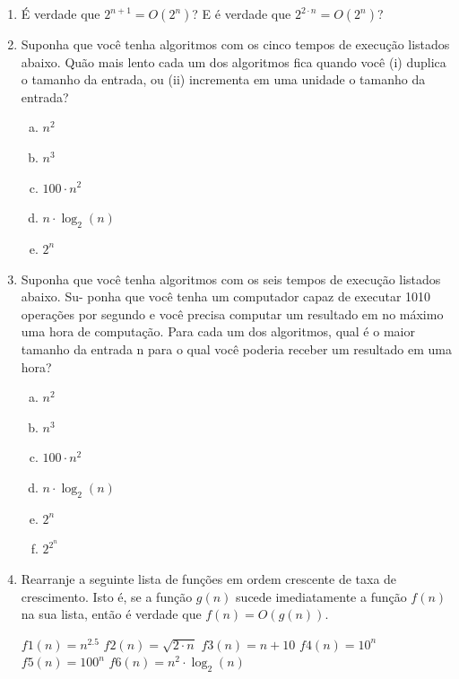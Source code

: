 \documentclass[a4paper,10pt]{article}
\begin{document}
\begin{enumerate}
 
 
\item É verdade que $2^{n+1} = O(2^n)$? E é verdade que $2^{2 \cdot n} = O(2^n)$?

\item Suponha que você tenha algoritmos com os cinco tempos de execução listados abaixo.
Quão mais lento cada um dos algoritmos fica quando você (i) duplica o tamanho da
entrada, ou (ii) incrementa em uma unidade o tamanho da entrada?

  \begin{enumerate}[(a)]
\item $n^2$
\item $n^3$
\item $100 \cdot n^2$
\item $n \cdot \log_2(n)$
\item $2^n$
  \end{enumerate}

\item Suponha que você tenha algoritmos com os seis tempos de execução listados abaixo. Su-
ponha que você tenha um computador capaz de executar 1010 operações por segundo
e você precisa computar um resultado em no máximo uma hora de computação. Para
cada um dos algoritmos, qual é o maior tamanho da entrada n para o qual você poderia
receber um resultado em uma hora?

  \begin{enumerate}[(a)]
\item $n^2$
\item $n^3$
\item $100\cdot n^2$
\item $n\cdot \log_2(n)$
\item $2^n$
\item $2^{2^n}$

  \end{enumerate}

\item Rearranje a seguinte lista de funções em ordem crescente de taxa de crescimento. Isto é,
se a função $g(n)$ sucede imediatamente a função $f(n)$ na sua lista, então é verdade que $f(n) = O(g(n))$.


\begin{center}
 
$f1(n) = n^{2.5}$ \linebreak
$f2(n) = \sqrt{2\cdot n}$ \linebreak
$f3(n) = n + 10$ \linebreak
$f4(n) = 10^n$ \linebreak
$f5(n) = 100^n$ \linebreak
$f6(n) = n^2 \cdot \log_2(n)$ \linebreak


\end{center}
\end{enumerate}
\end{document}

